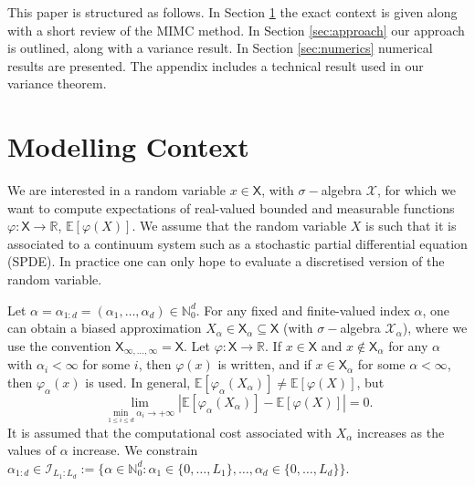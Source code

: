 \documentclass[english]{article}
\begin{document}
This paper is structured as follows. In Section \ref{sec:model} the exact context is given along with a short review of the MIMC method.
In Section \ref{sec:approach} our approach is outlined, along with a variance result. In Section \ref{sec:numerics} numerical results
are presented. The appendix includes a technical result used in our variance theorem.







\section{Modelling Context}
\label{sec:model}

We are interested in a random variable $x\in\mathsf{X}$, 
with $\sigma-$algebra $\mathcal{X}$, 
for which we want to compute
expectations of real-valued bounded and measurable functions $\varphi:\mathsf{X}\rightarrow\mathbb{R}$, $\mathbb{E}[\varphi(X)]$. 
We assume that the random variable $X$ is such that it is associated to a continuum system such as
a stochastic partial differential equation (SPDE). In practice one can only hope to evaluate a discretised
version of the random variable.

 Let $\alpha=\alpha_{1:d}=(\alpha_1,\dots,\alpha_d)\in\mathbb{N}_0^d$.
For any fixed and finite-valued %
index $\alpha$, one 
can obtain a biased approximation $X_{\alpha}\in\mathsf{X}_{\alpha}\subseteq\mathsf{X}$
(with $\sigma-$algebra $\mathcal{X}_{\alpha}$), where
we use the convention $\mathsf{X}_{\infty,\dots,\infty}=\mathsf{X}$.
Let $\varphi:\mathsf{X}\rightarrow\mathbb{R}$.
If $x\in\mathsf{X}$ and  $x \notin \mathsf{X}_{\alpha}$ for any $\alpha$ with $\alpha_i<\infty$ for some $i$, 
then $\varphi(x)$ is written, and if $x\in\mathsf{X}_{\alpha}$ for some $\alpha<\infty$, 
then $\varphi_{\alpha}(x)$ is used.
In general, $\mathbb{E}[\varphi_{\alpha}(X_{\alpha})]\neq\mathbb{E}[\varphi(X)]$, but
\begin{equation}
\lim_{\min_{1\leq i\leq d}\alpha_i \rightarrow+\infty}|\mathbb{E}[\varphi_{\alpha}(X_{\alpha})]-\mathbb{E}[\varphi(X)]| = 0.\label{eq:assump1}
\end{equation}
It is assumed that the computational cost associated with $X_{\alpha}$ increases as the values of $\alpha$
increase. We constrain $\alpha_{1:d}\in\mathcal{I}_{ L_1:L_d}  := \{\alpha\in\mathbb{N}_0^d:\alpha_1\in\{0,\dots,L_1\},\dots,\alpha_d\in\{0,\dots,L_d\}\}$.
\end{document}
